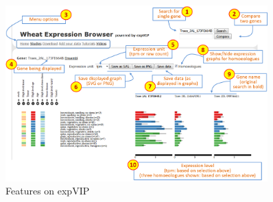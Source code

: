 \begin{figure}
\includegraphics[width=0.90\textwidth]{expVIP/tutorial/images/Figure1.png} 
\caption{Features on expVIP}
\label{fig:exp:tutorial1}
\end{figure}
